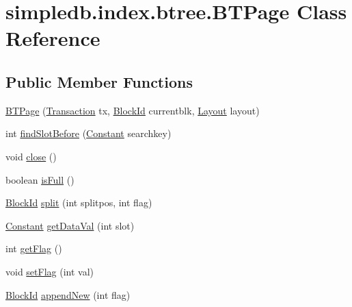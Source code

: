 \hypertarget{classsimpledb_1_1index_1_1btree_1_1BTPage}{}\section{simpledb.\+index.\+btree.\+B\+T\+Page Class Reference}
\label{classsimpledb_1_1index_1_1btree_1_1BTPage}
\subsection*{Public Member Functions}
\begin{DoxyCompactItemize}
\item 
\hyperlink{classsimpledb_1_1index_1_1btree_1_1BTPage_a1ef33a79d3b3bb2f7bf9859cb046df02}{B\+T\+Page} (\hyperlink{classsimpledb_1_1tx_1_1Transaction}{Transaction} tx, \hyperlink{classsimpledb_1_1file_1_1BlockId}{Block\+Id} currentblk, \hyperlink{classsimpledb_1_1record_1_1Layout}{Layout} layout)
\item 
int \hyperlink{classsimpledb_1_1index_1_1btree_1_1BTPage_ab1ad1f77a657d6bca43d428a55e33efd}{find\+Slot\+Before} (\hyperlink{classsimpledb_1_1query_1_1Constant}{Constant} searchkey)
\item 
void \hyperlink{classsimpledb_1_1index_1_1btree_1_1BTPage_add568d42fe2e359adbacdfe4adee61b3}{close} ()
\item 
boolean \hyperlink{classsimpledb_1_1index_1_1btree_1_1BTPage_ab7753b547f62a31c9d5c75932f3dcdbe}{is\+Full} ()
\item 
\hyperlink{classsimpledb_1_1file_1_1BlockId}{Block\+Id} \hyperlink{classsimpledb_1_1index_1_1btree_1_1BTPage_acea0d766bf9bae1d35bf734e280505db}{split} (int splitpos, int flag)
\item 
\hyperlink{classsimpledb_1_1query_1_1Constant}{Constant} \hyperlink{classsimpledb_1_1index_1_1btree_1_1BTPage_a1e192bef2519022c3b29aae2d6162861}{get\+Data\+Val} (int slot)
\item 
int \hyperlink{classsimpledb_1_1index_1_1btree_1_1BTPage_a85cda5670746c6d33e2e57fe482d2677}{get\+Flag} ()
\item 
void \hyperlink{classsimpledb_1_1index_1_1btree_1_1BTPage_a7ae809da6323d411d984e706523fff46}{set\+Flag} (int val)
\item 
\hyperlink{classsimpledb_1_1file_1_1BlockId}{Block\+Id} \hyperlink{classsimpledb_1_1index_1_1btree_1_1BTPage_ac6f092a2811f1a70b18b6795df1311b7}{append\+New} (int flag)
\item 
\mbox{\label{classsimpledb_1_1index_1_1btree_1_1BTPage_a01d439e4a61bf73c653c8c93c694b0fc}} 

\end{DoxyCompactItemize}
